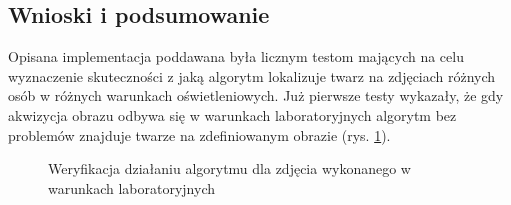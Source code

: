 \subsection{Wnioski i podsumowanie}
Opisana implementacja poddawana była licznym testom mających na celu wyznaczenie
skuteczności z jaką algorytm lokalizuje twarz na zdjęciach różnych osób w
różnych warunkach oświetleniowych. Już pierwsze testy wykazały, że gdy akwizycja
obrazu odbywa się w warunkach laboratoryjnych algorytm bez problemów znajduje
twarze na zdefiniowanym obrazie (rys. \ref{fig:face-detect-result}).
\begin{figure}[ht!]
 \centering
 \caption[caption-fdetect]{Weryfikacja działaniu algorytmu dla zdjęcia
 wykonanego w warunkach laboratoryjnych \footnotemark}
 \label{fig:face-detect-result}
\end{figure}

